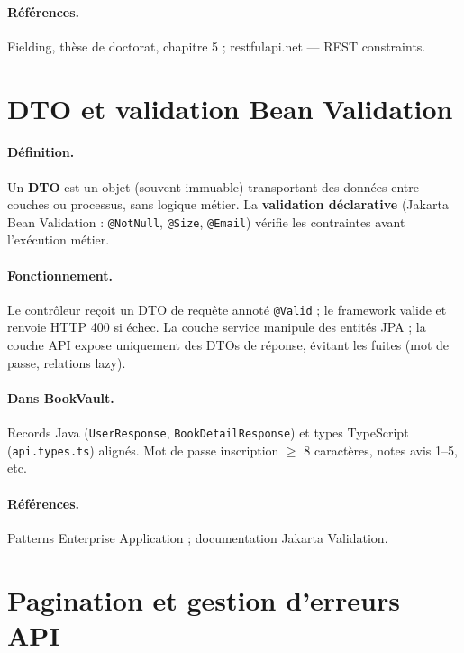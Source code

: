 \documentclass[12pt,a4paper]{report}
\begin{document}
\paragraph{Références.} Fielding, thèse de doctorat, chapitre 5 ; restfulapi.net — REST constraints.\par


\section{DTO et validation Bean Validation}

\paragraph{Définition.} Un \textbf{DTO} est un objet (souvent immuable) transportant des données entre couches ou processus, sans logique métier. La \textbf{validation déclarative} (Jakarta Bean Validation : \texttt{@NotNull}, \texttt{@Size}, \texttt{@Email}) vérifie les contraintes avant l'exécution métier.\par

\paragraph{Fonctionnement.} Le contrôleur reçoit un DTO de requête annoté \texttt{@Valid} ; le framework valide et renvoie HTTP 400 si échec. La couche service manipule des entités JPA ; la couche API expose uniquement des DTOs de réponse, évitant les fuites (mot de passe, relations lazy).\par

\paragraph{Dans BookVault.} Records Java (\texttt{UserResponse}, \texttt{BookDetailResponse}) et types TypeScript (\texttt{api.types.ts}) alignés. Mot de passe inscription $\geq$ 8 caractères, notes avis 1--5, etc.\par

\paragraph{Références.} Patterns Enterprise Application ; documentation Jakarta Validation.\par


\section{Pagination et gestion d'erreurs API}
\end{document}
